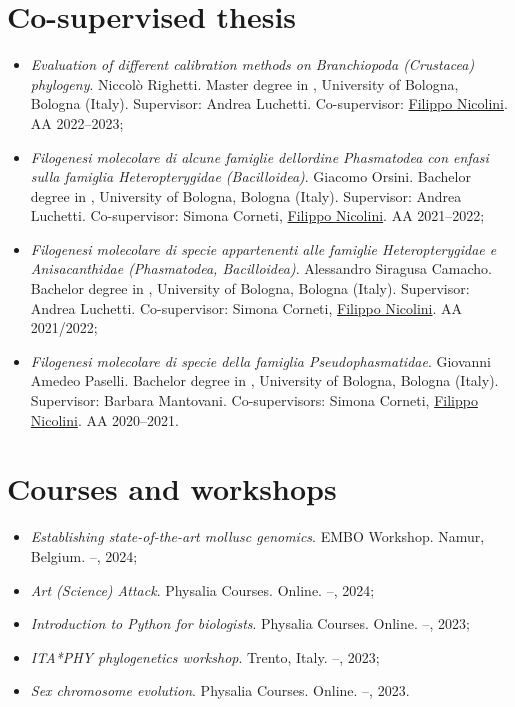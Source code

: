 \section*{Co-supervised thesis}
\begin{itemize}
	\item \textit{Evaluation of different calibration methods on Branchiopoda (Crustacea) phylogeny}. Niccolò Righetti. Master degree in , University of Bologna, Bologna (Italy). Supervisor: Andrea Luchetti. Co-supervisor: \underline{Filippo Nicolini}. AA 2022--2023;
	\item \textit{Filogenesi molecolare di alcune famiglie dell\curlyapostrophe ordine Phasmatodea con enfasi sulla famiglia Heteropterygidae (Bacilloidea)}. Giacomo Orsini. Bachelor degree in , University of Bologna, Bologna (Italy). Supervisor: Andrea Luchetti. Co-supervisor: Simona Corneti, \underline{Filippo Nicolini}. AA 2021--2022;
	\item \textit{Filogenesi molecolare di specie appartenenti alle famiglie Heteropterygidae e Anisacanthidae (Phasmatodea, Bacilloidea)}. Alessandro Siragusa Camacho. Bachelor degree in , University of Bologna, Bologna (Italy). Supervisor: Andrea Luchetti. Co-supervisor: Simona Corneti, \underline{Filippo Nicolini}. AA 2021/2022;
	\item \textit{Filogenesi molecolare di specie della famiglia Pseudophasmatidae}. Giovanni Amedeo Paselli. Bachelor degree in , University of Bologna, Bologna (Italy). Supervisor: Barbara Mantovani. Co-supervisors: Simona Corneti, \underline{Filippo Nicolini}. AA 2020--2021.
\end{itemize}

\section*{Courses and workshops}
\begin{itemize}
	\item \textit{Establishing state-of-the-art mollusc genomics}. EMBO Workshop. Namur, Belgium.  --, 2024;
	\item \textit{Art (Science) Attack}. Physalia Courses. Online.  --, 2024;
	\item \textit{Introduction to Python for biologists}. Physalia Courses. Online.  --, 2023;
	\item \textit{ITA*PHY phylogenetics workshop}. Trento, Italy.  --, 2023;
	\item \textit{Sex chromosome evolution}. Physalia Courses. Online.  --, 2023.
\end{itemize}

